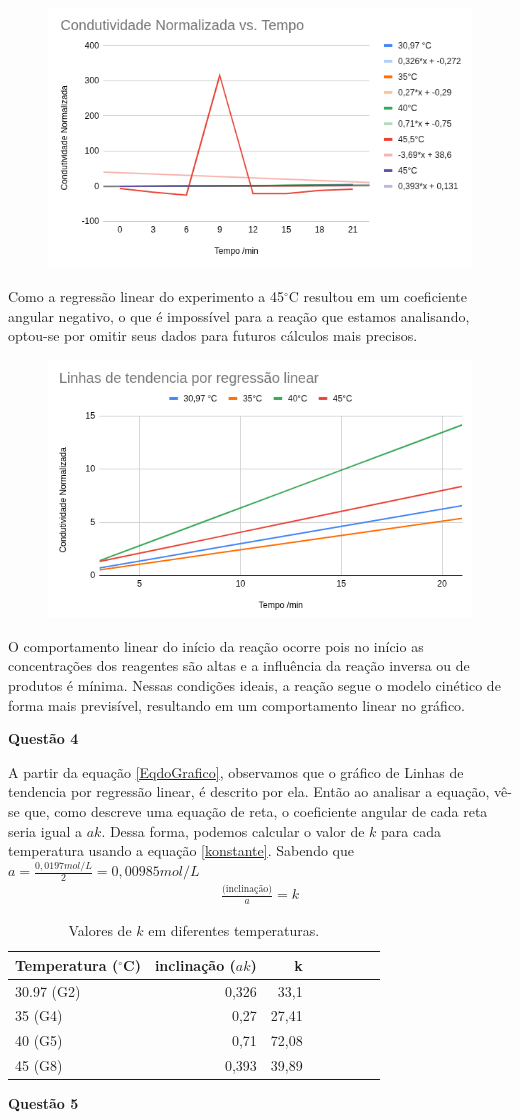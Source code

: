 \documentclass{article}
\begin{document}
\begin{figure}[H]
    \centering
    \includegraphics[width=.5\linewidth]{figs/graph3.png}
    \label{grafico3}
\end{figure}
Como a regressão linear do experimento a 45$^{\circ}$C resultou em um coeficiente angular negativo, o que é impossível para a reação que estamos analisando, optou-se por omitir seus dados para futuros cálculos mais precisos.
\begin{figure}[H]
	\centering
	\includegraphics[width=.5\linewidth]{figs/LinhaTendencia.png}
	\label{grafico4}
\end{figure}
O comportamento linear do início da reação ocorre pois no início as concentrações dos reagentes são altas e a influência da reação inversa ou de produtos é mínima. Nessas condições ideais, a reação segue o modelo cinético de forma mais previsível, resultando em um comportamento linear no gráfico.

\textbf{Questão 4}

A partir da equação \cref{EqdoGrafico}, observamos que o gráfico de Linhas de tendencia por regressão linear, é descrito por ela. Então ao analisar a equação, vê-se que, como descreve uma equação de reta, o coeficiente angular de cada reta seria igual a \(ak\).
Dessa forma, podemos calcular o valor de \(k\) para cada temperatura usando a equação \cref{konstante}. Sabendo que \(a = \frac{0,0197 mol/L}{2} = 0,00985 mol/L\) 
\begin{align}
	\frac{\text{(inclinação)}}{a} = k
	\label{konstante}
\end{align}

\begin{table}[H]
\centering
\caption{Valores de $k$ em diferentes temperaturas.}
\label{tab:k_norm}
\begin{tabular}{lrrrrrrr}
\toprule
\textbf{Temperatura ($^{\circ}$C)}    & \textbf{inclinação ($ak$)} & {\textbf{k}} \\
\midrule
30.97 (G2) & 0,326 & 33,1\\
35 (G4)    & 0,27 & 27,41\\
40 (G5)    & 0,71 & 72,08\\
45 (G8)    & 0,393 & 39,89\\
\bottomrule
\end{tabular}
\end{table}
\textbf{Questão 5}
\end{document}
